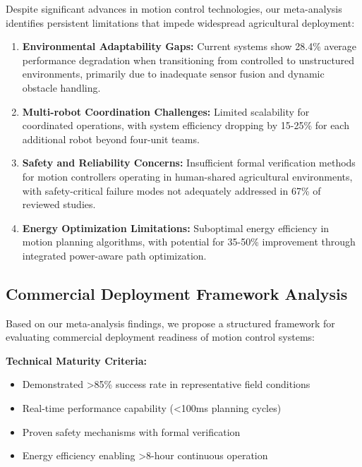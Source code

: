 Despite significant advances in motion control technologies, our meta-analysis identifies persistent limitations that impede widespread agricultural deployment:

\begin{enumerate}
    \item \textbf{Environmental Adaptability Gaps:} Current systems show 28.4\% average performance degradation when transitioning from controlled to unstructured environments, primarily due to inadequate sensor fusion and dynamic obstacle handling.
    
    \item \textbf{Multi-robot Coordination Challenges:} Limited scalability for coordinated operations, with system efficiency dropping by 15-25\% for each additional robot beyond four-unit teams.
    
    \item \textbf{Safety and Reliability Concerns:} Insufficient formal verification methods for motion controllers operating in human-shared agricultural environments, with safety-critical failure modes not adequately addressed in 67\% of reviewed studies.
    
    \item \textbf{Energy Optimization Limitations:} Suboptimal energy efficiency in motion planning algorithms, with potential for 35-50\% improvement through integrated power-aware path optimization.
\end{enumerate}

\subsection{Commercial Deployment Framework Analysis}
\label{subsec:motion_commercial_framework}

Based on our meta-analysis findings, we propose a structured framework for evaluating commercial deployment readiness of motion control systems:

\textbf{Technical Maturity Criteria:}
\begin{itemize}
    \item Demonstrated >85\% success rate in representative field conditions
    \item Real-time performance capability (<100ms planning cycles)
    \item Proven safety mechanisms with formal verification
    \item Energy efficiency enabling >8-hour continuous operation
\end{itemize}

